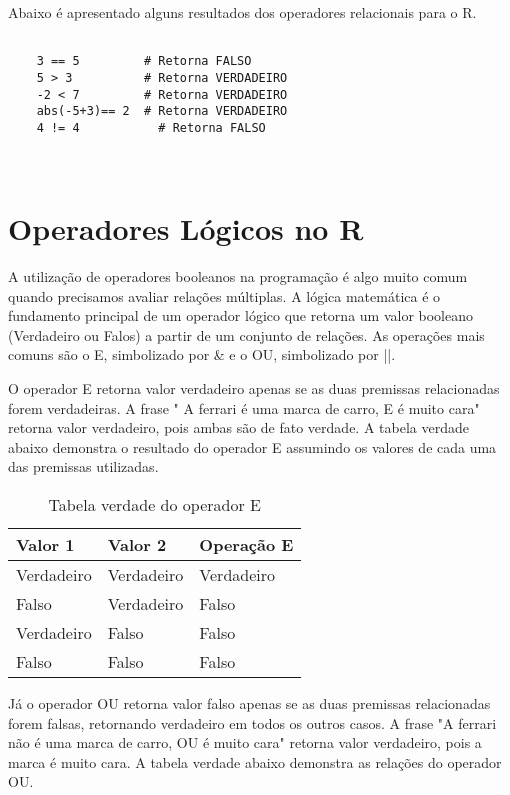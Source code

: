 Abaixo é apresentado alguns resultados dos operadores relacionais para o R. 

\begin{scriptsize}
	\estiloR
	\begin{lstlisting}[caption={Exemplo de operadores relacionais no R}, label=lst:rcode]
	
	3 == 5         # Retorna FALSO
	5 > 3          # Retorna VERDADEIRO 
	-2 < 7         # Retorna VERDADEIRO
	abs(-5+3)== 2  # Retorna VERDADEIRO  
	4 != 4 		     # Retorna FALSO
	
	
	\end{lstlisting}
\end{scriptsize}

\section{Operadores Lógicos no R} 

A utilização de operadores booleanos na programação é algo muito comum quando precisamos avaliar relações múltiplas. A lógica matemática é o fundamento principal de um operador lógico que retorna um valor booleano (Verdadeiro ou Falos) a partir de um conjunto de relações. As operações mais comuns são o E, simbolizado por \& e o OU, simbolizado por ||. 

O operador E retorna valor verdadeiro apenas se as duas premissas relacionadas forem verdadeiras. A frase " A ferrari é uma marca de carro, E é muito cara" retorna valor verdadeiro, pois ambas são de fato verdade. A tabela verdade abaixo demonstra o resultado do operador E assumindo os valores de cada uma das premissas utilizadas. 

\FloatBarrier
\begin{table}[h]
	\centering
	\begin{tabular}{@{}lll@{}}
		\toprule
		Valor 1    & Valor 2    & Operação E \\ \midrule
		Verdadeiro & Verdadeiro & Verdadeiro \\
		Falso      & Verdadeiro & Falso      \\
		Verdadeiro & Falso      & Falso      \\
		Falso      & Falso      & Falso      \\ \bottomrule
	\end{tabular}
	\caption{Tabela verdade do operador E}
	\label{tab:my-table}
\end{table}
\FloatBarrier

Já o operador OU retorna valor falso apenas se as duas premissas relacionadas forem falsas, retornando verdadeiro em todos os outros casos. A frase "A ferrari não é uma marca de carro, OU é muito cara" retorna valor verdadeiro, pois a marca é muito cara. A tabela verdade abaixo demonstra as relações do operador OU.

